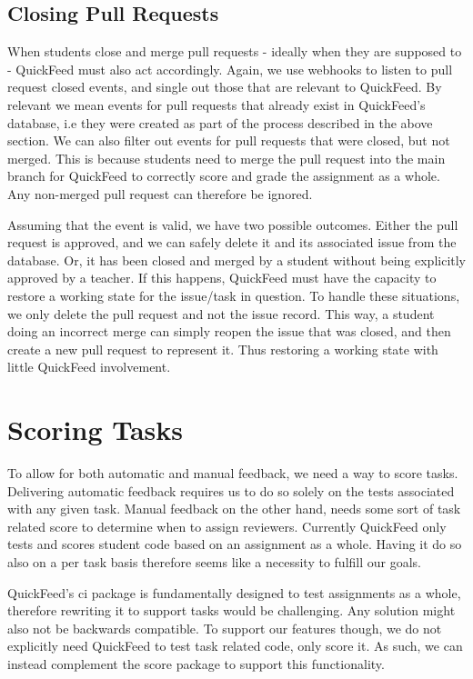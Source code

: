 \subsection{Closing Pull Requests}

When students close and merge pull requests - ideally when they are supposed to - QuickFeed must also act accordingly.
Again, we use webhooks to listen to pull request closed events, and single out those that are relevant to QuickFeed.
By relevant we mean events for pull requests that already exist in QuickFeed's database, i.e they were created as part of the process described in the above section.
We can also filter out events for pull requests that were closed, but not merged.
This is because students need to merge the pull request into the main branch for QuickFeed to correctly score and grade the assignment as a whole.
Any non-merged pull request can therefore be ignored.

Assuming that the event is valid, we have two possible outcomes.
Either the pull request is approved, and we can safely delete it and its associated issue from the database.
Or, it has been closed and merged by a student without being explicitly approved by a teacher.
If this happens, QuickFeed must have the capacity to restore a working state for the issue/task in question.
To handle these situations, we only delete the pull request and not the issue record.
This way, a student doing an incorrect merge can simply reopen the issue that was closed, and then create a new pull request to represent it.
Thus restoring a working state with little QuickFeed involvement.

\section{Scoring Tasks}

To allow for both automatic and manual feedback, we need a way to score tasks.
Delivering automatic feedback requires us to do so solely on the tests associated with any given task.
Manual feedback on the other hand, needs some sort of task related score to determine when to assign reviewers.
Currently QuickFeed only tests and scores student code based on an assignment as a whole.
Having it do so also on a per task basis therefore seems like a necessity to fulfill our goals.

QuickFeed's ci package is fundamentally designed to test assignments as a whole, therefore rewriting it to support tasks would be challenging.
Any solution might also not be backwards compatible.
To support our features though, we do not explicitly need QuickFeed to test task related code, only score it.
As such, we can instead complement the score package to support this functionality.

